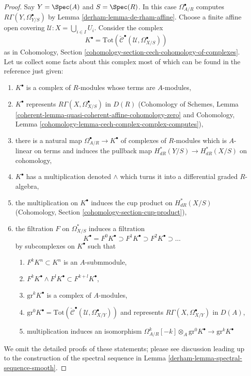 \begin{proof}

Say $Y = \Spec(A)$ and $S = \Spec(R)$.
In this case $\Omega^\bullet_{A/R}$ computes
$R\Gamma(Y, \Omega^\bullet_{Y/S})$ by Lemma \ref{derham-lemma-de-rham-affine}.
Choose a finite affine open covering $\mathcal{U} : X = \bigcup_{i \in I} U_i$.
Consider the complex
$$
K^\bullet =
\text{Tot}(\check{\mathcal{C}}^\bullet(\mathcal{U}, \Omega_{X/S}^\bullet))
$$
as in
Cohomology, Section \ref{cohomology-section-cech-cohomology-of-complexes}.
Let us collect some facts about this complex most of which
can be found in the reference just given:
\begin{enumerate}
\item $K^\bullet$ is a complex of $R$-modules whose terms are
$A$-modules,
\item $K^\bullet$ represents $R\Gamma(X, \Omega^\bullet_{X/S})$ in $D(R)$
(Cohomology of Schemes, Lemma
\ref{coherent-lemma-quasi-coherent-affine-cohomology-zero} and
Cohomology, Lemma \ref{cohomology-lemma-cech-complex-complex-computes}),
\item there is a natural map $\Omega^\bullet_{A/R} \to K^\bullet$
of complexes of $R$-modules which is $A$-linear on terms and
induces the pullback map $H^*_{dR}(Y/S) \to H^*_{dR}(X/S)$
on cohomology,
\item $K^\bullet$ has a multiplication denoted $\wedge$
which turns it into a differential graded $R$-algebra,
\item the multiplication on $K^\bullet$
induces the cup product on $H^*_{dR}(X/S)$
(Cohomology, Section \ref{cohomology-section-cup-product}),
\item the filtration $F$ on $\Omega^*_{X/S}$ induces a filtration
$$
K^\bullet =
F^0K^\bullet \supset F^1K^\bullet \supset F^2K^\bullet \supset \ldots
$$
by subcomplexes on $K^\bullet$ such that
\begin{enumerate}
\item $F^kK^n \subset K^n$ is an $A$-submmodule,
\item $F^kK^\bullet \wedge F^lK^\bullet \subset F^{k + l}K^\bullet$,
\item $\text{gr}^kK^\bullet$ is a complex of $A$-modules,
\item $\text{gr}^0K^\bullet =
\text{Tot}(\check{\mathcal{C}}^\bullet(\mathcal{U}, \Omega_{X/Y}^\bullet))$
and represents $R\Gamma(X, \Omega^\bullet_{X/Y})$ in $D(A)$,
\item multiplication induces an isomorphism
$\Omega^k_{A/R}[-k] \otimes_A \text{gr}^0K^\bullet \to \text{gr}^kK^\bullet$
\end{enumerate}
\end{enumerate}
We omit the detailed proofs of these statements; please see discussion
leading up to the construction of the spectral sequence in
Lemma \ref{derham-lemma-spectral-sequence-smooth}.


\end{proof}
